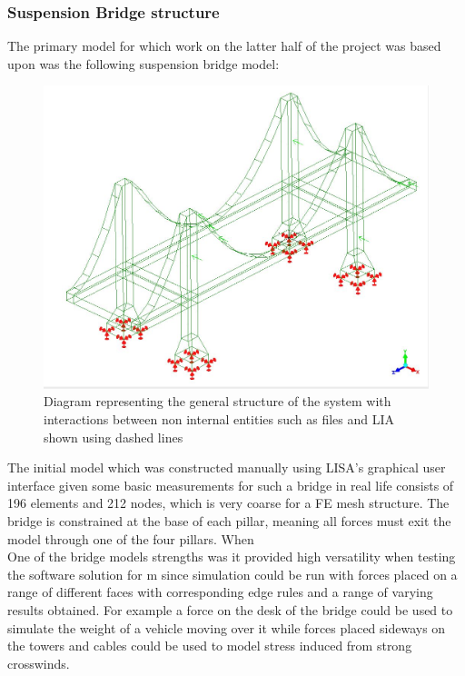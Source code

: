 \documentclass{article}
\begin{document}
\subsubsection{Suspension Bridge structure}

\noindent
The primary model for which work on the latter half of the project was based upon was the following suspension bridge model:


\begin{figure}[!h]
  \centerline{\includegraphics[width=150mm, scale=1]{BasicBridge.jpeg}}
  \caption{Diagram representing the general structure of the system with interactions between non internal entities such as files and LIA shown using dashed lines}
  \label{fig:h-refinementImp}
\end{figure}


\newpage
\noindent
The initial model which was constructed manually using LISA's graphical user interface given some basic measurements for such a bridge in real \cite{}life consists of 196 elements and 212 nodes, which is very coarse for a FE mesh structure. The bridge is constrained at the base of each pillar, meaning all forces must exit the model through one of the four pillars. When \\ 


\noindent
One of the bridge models strengths was it provided high versatility when testing the software solution for m since simulation could be run with forces placed on a range of different faces with corresponding edge rules and a range of varying results obtained. For example a force on the desk of the bridge could be used to simulate the weight of a vehicle moving over it while forces placed sideways on the towers and cables could be used to model stress induced from strong crosswinds.
\end{document}
